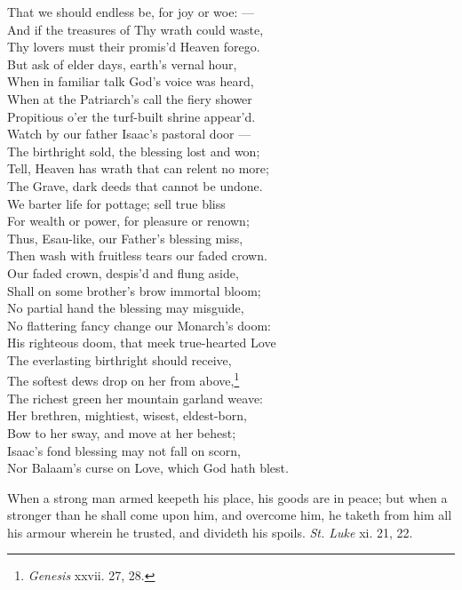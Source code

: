  That we should endless be, for joy or woe: — \\
 And if the treasures of Thy wrath could waste, \\
 Thy lovers must their promis’d Heaven forego. \\
  But ask of elder days, earth’s vernal hour, \\
 When in familiar talk God’s voice was heard, \\
 When at the Patriarch’s call the fiery shower \\
 Propitious o’er the turf-built shrine appear’d. \\
  Watch by our father Isaac’s pastoral door — \\
 The birthright sold, the blessing lost and won; \\
 Tell, Heaven has wrath that can relent no more; \\
 The Grave, dark deeds that cannot be undone. \\
  We barter life for pottage; sell true bliss \\
 For wealth or power, for pleasure or renown; \\
 Thus, Esau-like, our Father’s blessing miss, \\
 Then wash with fruitless tears our faded crown. \\
  Our faded crown, despis’d and flung aside, \\
 Shall on some brother’s brow immortal bloom; \\
 No partial hand the blessing may misguide, \\
 No flattering fancy change our Monarch’s doom: \\
  His righteous doom, that meek true-hearted Love \\
 The everlasting birthright should receive, \\
 The softest dews drop on her from above,\footnote{\emph{Genesis} xxvii. 27, 28.} \\
 The richest green her mountain garland weave: \\
  Her brethren, mightiest, wisest, eldest-born, \\
 Bow to her sway, and move at her behest; \\
 Isaac’s fond blessing may not fall on scorn, \\
 Nor Balaam’s curse on Love, which God hath blest.\\


When a strong man armed keepeth his place, his goods are in peace; but when a stronger than he shall come upon him, and overcome him, he taketh from him all his armour wherein he trusted, and divideth his spoils. \emph{St. Luke} xi. 21, 22.

